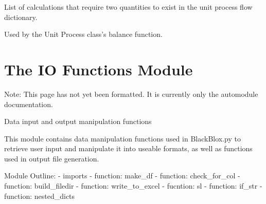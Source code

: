 \documentclass[a4paper,10pt,english]{sphinxmanual}
\begin{document}

\begin{fulllineitems}
\label{\detokenize{calculators:calculators.twoQty_calc_list}}
List of calculations that require two quantities to exist in the unit process flow dictionary.

Used by the Unit Process class’s balance function.

\end{fulllineitems}



\section{The IO Functions Module}
\label{\detokenize{io_functions:the-io-functions-module}}\label{\detokenize{io_functions::doc}}
Note: This page has not yet been formatted. It is currently only the automodule documentation.

\label{\detokenize{io_functions:module-io_functions}}
Data input and output manipulation functions

This module contains data manipulation functions used in BlackBlox.py to
retrieve user input and manipulate it into useable formats, as well as
functions used in output file generation.

Module Outline:
- imports
- function: make\_df
- function: check\_for\_col
- function: build\_filedir
- function: write\_to\_excel
- fucntion: sl
- function: if\_str
- function: nested\_dicts
\end{document}
